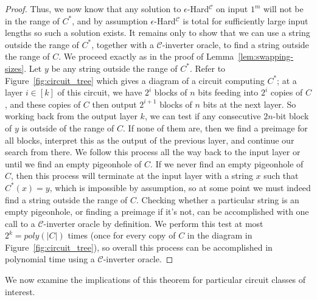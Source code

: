 \begin{proof}
 Thus, we now know that any solution to  {\sc $\epsilon$-Hard}$^{\mathcal{C}}$ on input $1^m$ will not be in the range of $C^*$, and by assumption {\sc $\epsilon$-Hard}$^{\mathcal{C}}$ is total for sufficiently large input lengths so such a solution exists. It remains only to show that we can use a string outside the range of $C^*$, together with a $\mathcal{C}$-inverter oracle, to find a string outside the range of $C$. We proceed exactly as in the proof of Lemma~\ref{lem:swapping-sizes}. Let $y$ be any string outside the range of $C^*$. Refer to Figure~\ref{fig:circuit_tree} which gives a diagram of a circuit computing $C^*$; at a layer $i \in [k]$ of this circuit, we have $2^i$ blocks of $n$ bits feeding into $2^i$ copies of $C$, and these copies of $C$ then output $2^{i+1}$ blocks of $n$ bits at the next layer. So working back from the output layer $k$, we can test if any consecutive $2n$-bit block of $y$ is outside of the range of $C$. If none of them are, then we find a preimage for all blocks, interpret this as the output of the previous layer, and continue our search from there. We follow this process all the way back to the input layer or until we find an empty pigeonhole of $C$. If we never find an empty pigeonhole of $C$, then this process will terminate at the input layer with a string $x$ such that $C^*(x) = y$, which is impossible by assumption, so at some point we must indeed find a string outside the range of $C$. Checking whether a particular string is an empty pigeonhole, or finding a preimage if it's not, can be accomplished with one call to a $\mathcal{C}$-inverter oracle by definition. We perform this test at most $2^k = poly(|C|)$ times (once for every copy of $C$ in the diagram in Figure~\ref{fig:circuit_tree}), so overall this process can be accomplished in polynomial time using a $\mathcal{C}$-inverter oracle.
\end{proof}

We now examine the implications of this theorem for particular circuit classes of interest.

